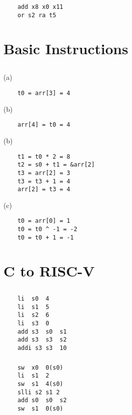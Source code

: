 \documentclass[UTF8,10pt,a4paper]{ctexart}
\begin{document}
\subsection{}
\begin{verbatim}
    add x8 x0 x11
    or s2 ra t5
\end{verbatim}
\section{Basic Instructions}
\subsection{}

(a) 
\begin{verbatim}
    t0 = arr[3] = 4
\end{verbatim}

(b)
\begin{verbatim}
    arr[4] = t0 = 4
\end{verbatim}

(b)
\begin{verbatim}
    t1 = t0 * 2 = 8
    t2 = s0 + t1 = &arr[2]
    t3 = arr[2] = 3
    t3 = t3 + 1 = 4
    arr[2] = t3 = 4
\end{verbatim}

(c)
\begin{verbatim}
    t0 = arr[0] = 1
    t0 = t0 ^ -1 = -2
    t0 = t0 + 1 = -1
\end{verbatim}
\section{C to RISC-V}
\subsection{}
\subsubsection{}
\begin{verbatim}
    li  s0  4
    li  s1  5
    li  s2  6
    li  s3  0
    add s3  s0  s1
    add s3  s3  s2
    addi s3 s3  10
\end{verbatim}
\subsubsection{}
\begin{verbatim}
    sw  x0  0(s0)
    li  s1  2
    sw  s1  4(s0)
    slli s2 s1 2
    add s0  s0  s2
    sw  s1  0(s0)
\end{verbatim}
\end{document}
